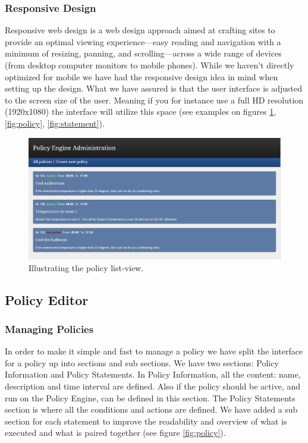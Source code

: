 \subsubsection{Responsive Design}
Responsive web design is a web design approach aimed at crafting sites to provide an optimal viewing experience—easy reading and navigation with a minimum of resizing, panning, and scrolling—across a wide range of devices (from desktop computer monitors to mobile phones). While we haven't directly optimized for mobile we have had the responsive design idea in mind when setting up the design. What we have assured is that the user interface is adjusted to the screen size of the user. Meaning if you for instance use a full HD resolution (1920x1080) the interface will utilize this space (see examples on figures \ref{fig:policylist}, \ref{fig:policy}, \ref{fig:statement}).

\begin{figure}[ht]
\centering
\includegraphics[width=\columnwidth]{policylist.png}
\caption{Illustrating the policy list-view.}
\label{fig:policylist}
\end{figure}

\subsection{Policy Editor}

\subsubsection{Managing Policies}
In order to make it simple and fast to manage a policy we have split the interface for a policy up into sections and sub sections. We have two sections: Policy Information and Policy Statements. In Policy Information, all the content: name, description and time interval are defined. Also if the policy should be active, and run on the Policy Engine, can be defined in this section. The Policy Statements section is where all the conditions and actions are defined. We have added a sub section for each statement to improve the readability and overview of what is executed and what is paired together (see figure \ref{fig:policy}).  

